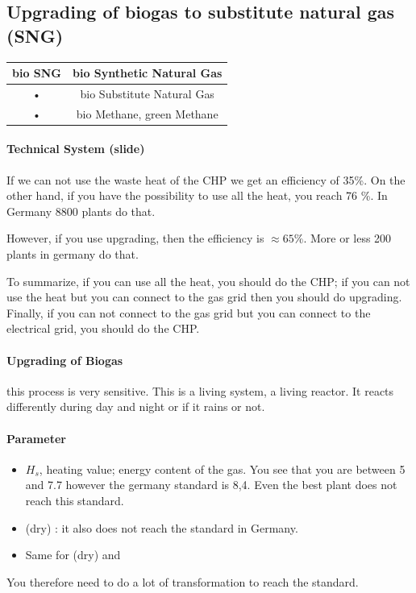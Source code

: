 \documentclass[10pt,a4paper]{article}
\begin{document}
\subsection{Upgrading of biogas to substitute natural gas (SNG)}

\begin{tabular}{|c|c|}
\hline 
bio SNG & bio Synthetic Natural Gas \\ 
\hline 
• & bio Substitute Natural Gas \\ 
\hline 
• & bio Methane, green Methane \\ 
\hline 
\end{tabular} 


\paragraph{Technical System (slide)}If we can not use the waste heat of the CHP we get an efficiency of 35\%. On the other hand, if you have the possibility to use all the heat, you reach 76 \%. In Germany 8800 plants do that.

However, if you use upgrading, then the efficiency is $\approx 65 \%$. More or less 200 plants in germany do that.

To summarize, if you can use all the heat, you should do the CHP; if you can not use the heat but you can connect to the gas grid then you should do upgrading. Finally, if you can not connect to the gas grid but you can connect to the electrical grid, you should do the CHP.

\paragraph{Upgrading of Biogas}this process is very sensitive. This is a living system, a living reactor. It reacts differently during day and night or if it rains or not.

\paragraph{Parameter}

\begin{itemize}
\item $H_s$, heating value; energy content of the gas. You see that you are between 5 and 7.7 however the germany standard is 8,4. Even the best plant does not reach this standard.
\item {} (dry) : it also does not reach the standard in Germany.   
\item Same for  (dry) and 
\end{itemize}
You therefore need to do a lot of transformation to reach the standard.
\end{document}

